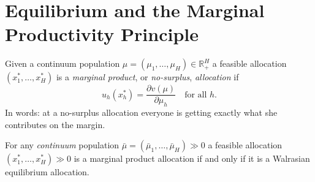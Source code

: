 \section{Equilibrium and the Marginal Productivity Principle}

\begin{defn}
    Given a continuum population $\mu = (\mu_1, \dots, \mu_H) \in \mathbb{R}^{H}_+$ a feasible allocation $(x^*_1, \dots, x^*_H)$ is a \emph{marginal product}, or \emph{no-surplus}, \emph{allocation} if
    \begin{equation*}
        u_h (x^*_h) = \frac{\partial v(\mu)}{\partial \mu_h} \quad \text{for all } h.
    \end{equation*}
    In words: at a no-surplus allocation everyone is getting exactly what she contributes on the margin.
\end{defn}

\begin{prop}
    For any \emph{continuum} population $\bar{\mu} = (\bar{\mu}_1, \dots, \bar{\mu}_H) \gg 0$ a feasible allocation $(x^*_1, \dots, x^*_H) \gg 0$ is a marginal product allocation if and only if it is a Walrasian equilibrium allocation.
\end{prop}

